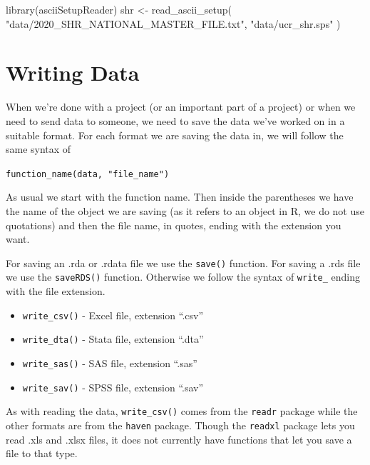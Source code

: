 \documentclass[
]{krantz}
\makeatletter
\newenvironment{Shaded}{\begin{snugshade}}{\end{snugshade}}
\newcommand{\FunctionTok}[1]{\textcolor[rgb]{0,0,0}{#1}}
\newcommand{\NormalTok}[1]{#1}
\newcommand{\OtherTok}[1]{\textcolor[rgb]{0.37,0.37,0.37}{#1}}
\newcommand{\StringTok}[1]{\textcolor[rgb]{0.5,0.5,0.5}{#1}}
\providecommand{\tightlist}{%
  \setlength{\itemsep}{0pt}\setlength{\parskip}{0pt}}
\newenvironment{kframe}{%
\medskip{}
\setlength{\fboxsep}{.8em}
 \def\at@end@of@kframe{}%
 \ifinner\ifhmode%
  \def\at@end@of@kframe{\end{minipage}}%
  \begin{minipage}{\columnwidth}%
 \fi\fi%
 \def\FrameCommand##1{\hskip\@totalleftmargin \hskip-\fboxsep
 \colorbox{shadecolor}{##1}\hskip-\fboxsep
     \hskip-\linewidth \hskip-\@totalleftmargin \hskip\columnwidth}%
 \MakeFramed {\advance\hsize-\width
   \@totalleftmargin\z@ \linewidth\hsize
   \@setminipage}}%
 {\par\unskip\endMakeFramed%
 \at@end@of@kframe}
\renewenvironment{Shaded}{\begin{kframe}}{\end{kframe}}
\makeatother
\begin{document}
\begin{Shaded}
\begin{Highlighting}[]
\FunctionTok{library}\NormalTok{(asciiSetupReader)}
\NormalTok{shr }\OtherTok{\textless{}{-}} \FunctionTok{read\_ascii\_setup}\NormalTok{(}
  \StringTok{"data/2020\_SHR\_NATIONAL\_MASTER\_FILE.txt"}\NormalTok{,}
  \StringTok{"data/ucr\_shr.sps"}
\NormalTok{)}
\end{Highlighting}
\end{Shaded}

\hypertarget{writing-data}{%
\section{Writing Data}\label{writing-data}}

When we're done with a project (or an important part of a
project) or when we need to send data to someone, we need to
save the data we've worked on in a suitable format. For each
format we are saving the data in, we will follow the same
syntax of

\texttt{function\_name(data,\ "file\_name")}

As usual we start with the function name. Then inside the
parentheses we have the name of the object we are saving (as
it refers to an object in R, we do not use quotations) and
then the file name, in quotes, ending with the extension you
want.

For saving an .rda or .rdata file we use the \texttt{save()}
function. For saving a .rds file we use the
\texttt{saveRDS()} function. Otherwise we follow the syntax
of \texttt{write\_} ending with the file extension.

\begin{itemize}
\tightlist
\item
  \texttt{write\_csv()} - Excel file, extension ``.csv''
\item
  \texttt{write\_dta()} - Stata file, extension ``.dta''
\item
  \texttt{write\_sas()} - SAS file, extension ``.sas''
\item
  \texttt{write\_sav()} - SPSS file, extension ``.sav''
\end{itemize}

As with reading the data, \texttt{write\_csv()} comes from
the \texttt{readr} package while the other formats are from
the \texttt{haven} package. Though the \texttt{readxl}
package lets you read .xls and .xlsx files, it does not
currently have functions that let you save a file to that
type.
\end{document}
